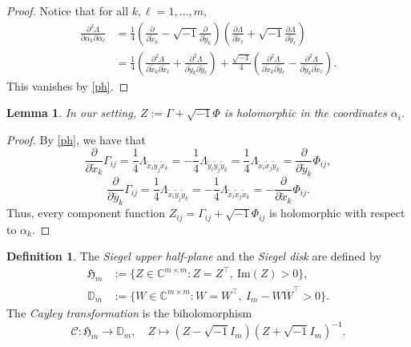 \documentclass[11pt,reqno]{amsart}
\newcommand{\C}{\mathbb{C}}
\theoremstyle{plain}
\newtheorem{lemma}[theorem]{Lemma}
\theoremstyle{definition}
\newtheorem{definition}[theorem]{Definition}
\numberwithin{equation}{section}
\begin{document}
\begin{proof}
Notice that for all $k,\ell=1,\ldots,m$,
\begin{align*}
\frac{\partial^{2}\Lambda}{\partial \alpha_{k}\partial\overline{\alpha}_{\ell}} & =  \displaystyle\frac{1}{4}\left( \frac{\partial}{\partial \tilde{x}_{k}}-\sqrt{-1}\frac{\partial}{\partial \tilde{y}_{k}} \right)\left( \frac{\partial \Lambda}{\partial \tilde{x}_{\ell}}+\sqrt{-1}\frac{\partial \Lambda}{\partial \tilde{y}_{\ell}} \right)\\
& =  \displaystyle \frac{1}{4} \left(\frac{\partial^2 \Lambda}{\partial\tilde{x}_{k}\partial \tilde{x}_{\ell}}+\frac{\partial^2 \Lambda}{\partial \tilde{y}_{k}\partial \tilde{y}_{\ell}}\right)+\frac{\sqrt{-1}}{4}\left(\frac{\partial^2 \Lambda}{\partial \tilde{x}_{k}\partial \tilde{y}_{\ell}}-\frac{\partial^2 \Lambda}{\partial  \tilde{y}_{k} \partial\tilde{x}_{\ell}}\right). 
\end{align*}
This vanishes by \eqref{ph}.
\end{proof}

\begin{lemma}\label{Zholo}
    In our setting, $Z := \Gamma+\sqrt{-1}\Phi$ is holomorphic in the coordinates $\alpha_i$.
\end{lemma}

\begin{proof}
    By \eqref{ph}, we have that
$$\frac{\partial}{\partial \tilde{x}_{k}}\Gamma_{ij}= \displaystyle\frac{1}{4}\Lambda_{\tilde{x}_{i}\tilde{y}_{j}\tilde{x}_{k}}
     = -\displaystyle\frac{1}{4}\Lambda_{\tilde{y}_{i}\tilde{y}_{j}\tilde{y}_{k}} 
    = \displaystyle\frac{1}{4}\Lambda_{\tilde{x}_{i}\tilde{x}_{j} \tilde{y}_{k}}
    = \displaystyle \frac{\partial}{\partial \tilde{y}_{k}} \Phi_{ij},
$$
$$\frac{\partial}{\partial \tilde{y}_{k}}\Gamma_{ij}  = \displaystyle\frac{1}{4}\Lambda_{\tilde{x}_{i}\tilde{y}_{j}\tilde{y}_{k}}
     = - \displaystyle\frac{1}{4}\Lambda_{\tilde{x}_{i}\tilde{x}_{j}\tilde{x}_{k}}
     = - \displaystyle \frac{\partial}{\partial \tilde{x}_{k}} \Phi_{ij}.
$$
Thus, every component function $Z_{ij} = \Gamma_{ij} +\sqrt{-1}\Phi_{ij}$ is holomorphic with respect to $\alpha_k$. 
\end{proof}

\begin{definition}\label{def:Siegel}
The \emph{Siegel upper half-plane} and the \emph{Siegel disk} are defined by
\begin{align*}\mathfrak{H}_{m}&:=\{Z\in \C^{m\times m}: Z=Z^{\top},\ \mathrm{Im}(Z)>0\},\\
\mathbb{D}_m &:=\{W\in \C^{m\times m}: W=W^{\top} ,\ I_{m}-W\overline{W}^{\top}>0 \}.
\end{align*}
The \emph{Cayley transformation} is the biholomorphism
$$\mathscr{C}:\mathfrak{H}_{m}\to \mathbb{D}_{m}, \quad Z \mapsto (Z-\sqrt{-1}I_{m})(Z+\sqrt{-1}I_{m})^{-1}.$$
\end{definition}
\end{document}
